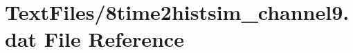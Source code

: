 \hypertarget{8time2histsim__channel9_8dat}{}\section{Text\+Files/8time2histsim\+\_\+channel9.dat File Reference}
\label{8time2histsim__channel9_8dat}

